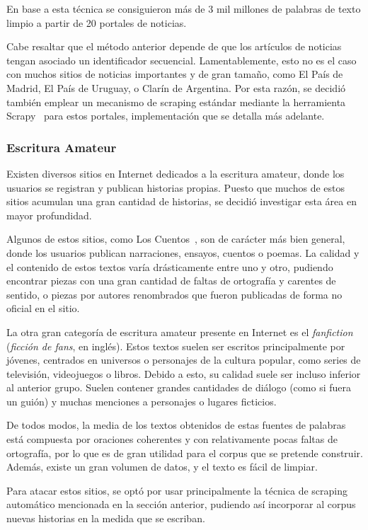 En base a esta técnica se consiguieron más de 3 mil millones de palabras de texto limpio a partir de
20 portales de noticias.

Cabe resaltar que el método anterior depende de que los artículos de noticias tengan asociado un
identificador secuencial. Lamentablemente, esto no es el caso con muchos sitios de noticias
importantes y de gran tamaño, como El País de Madrid, El País de Uruguay, o Clarín de Argentina. Por
esta razón, se decidió también emplear un mecanismo de scraping estándar mediante la herramienta
Scrapy~\cite{Scrapy} para estos portales, implementación que se detalla más adelante.


\subsubsection{Escritura Amateur}

Existen diversos sitios en Internet dedicados a la escritura amateur, donde los usuarios se
registran y publican historias propias. Puesto que muchos de estos sitios acumulan una gran cantidad
de historias, se decidió investigar esta área en mayor profundidad.

Algunos de estos sitios, como Los Cuentos~\cite{LosCuentos}, son de carácter más bien general, donde
los usuarios publican narraciones, ensayos, cuentos o poemas. La calidad y el contenido de estos
textos varía drásticamente entre uno y otro, pudiendo encontrar piezas con una gran cantidad de
faltas de ortografía y carentes de sentido, o piezas por autores renombrados que fueron publicadas
de forma no oficial en el sitio.

La otra gran categoría de escritura amateur presente en Internet es el \textit{fanfiction}
(\textit{ficción de fans}, en inglés). Estos textos suelen ser escritos principalmente por jóvenes,
centrados en universos o personajes de la cultura popular, como series de televisión, videojuegos o
libros. Debido a esto, su calidad suele ser incluso inferior al anterior grupo. Suelen contener
grandes cantidades de diálogo (como si fuera un guión) y muchas menciones a personajes o lugares
ficticios.

De todos modos, la media de los textos obtenidos de estas fuentes de palabras está compuesta por
oraciones coherentes y con relativamente pocas faltas de ortografía, por lo que es de gran utilidad
para el corpus que se pretende construir. Además, existe un gran volumen de datos, y el texto es
fácil de limpiar.

Para atacar estos sitios, se optó por usar principalmente la técnica de scraping automático
mencionada en la sección anterior, pudiendo así incorporar al corpus nuevas historias en la medida
que se escriban.


